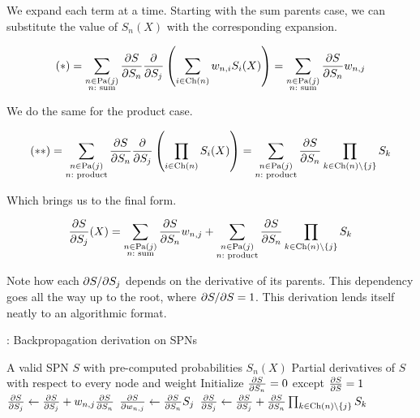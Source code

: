 We expand each term at a time. Starting with the sum parents case, we can substitute the value of
$S_n(X)$ with the corresponding expansion.

\begin{equation*}
  (\ast)=\sum_{\substack{n\in\operatorname*{\text{Pa}}(j)\\n:\text{ sum}}}\frac{\partial S}{\partial S_n}\frac{\partial}{\partial S_j}\left(\sum_{i\in\operatorname*{\text{Ch}}(n)}
    w_{n,i}S_i(X)\right)=\sum_{\substack{n\in\operatorname*{\text{Pa}}(j)\\n:\text{ sum}}}\frac{\partial S}{\partial S_n}w_{n,j}
\end{equation*}

We do the same for the product case.

\begin{equation*}
  (\ast\ast)=\sum_{\substack{n\in\operatorname*{\text{Pa}}(j)\\n:\text{ product}}}\frac{\partial S}{\partial S_n}\frac{\partial}{\partial S_j}\left(\prod_{i\in\operatorname*{\text{Ch}}(n)}
    S_i(X)\right)=\sum_{\substack{n\in\operatorname*{\text{Pa}}(j)\\n:\text{ product}}}\frac{\partial S}{\partial S_n}\prod_{k\in
      \operatorname*{\text{Ch}}(n)\setminus\{j\}}S_k
\end{equation*}

Which brings us to the final form.

\begin{equation}
  \frac{\partial S}{\partial S_j}(X)=\sum_{\substack{n\in\operatorname*{\text{Pa}}(j)\\n:\text{
        sum}}}\frac{\partial S}{\partial S_n}w_{n,j}+\sum_{\substack{n\in\operatorname*{\text{Pa}}(j)\\n: \text{
        product}}}\frac{\partial S}{\partial S_n}\prod_{k\in\operatorname*{\text{Ch}}(n)\setminus\{j\}}S_k
\end{equation}

Note how each $\partial S/\partial S_j$ depends on the derivative of its parents. This dependency goes all
the way up to the root, where $\partial S/\partial S=1$. This derivation lends itself neatly to an
algorithmic format.

\begin{algorithm}[H]
  \caption{: Backpropagation derivation on SPNs}
  \begin{algorithmic}[1]
    \Require A valid SPN $S$ with pre-computed probabilities $S_n(X)$
    \Ensure Partial derivatives of $S$ with respect to every node and weight
    \State Initialize $\frac{\partial S}{\partial S_n}=0$ except $\frac{\partial S}{\partial S}=1$
          \State $\frac{\partial S}{\partial S_j}\gets\frac{\partial S}{\partial S_j}+w_{n,j}\frac{\partial S}{\partial S_n}$
          \State $\frac{\partial S}{\partial w_{n,j}}\gets\frac{\partial S}{\partial S_n}S_j$
        \EndFor%
      \Else%
          \State $\frac{\partial S}{\partial S_j}\gets\frac{\partial S}{\partial S_j}+\frac{\partial S}{\partial S_n}\prod_{k\in\operatorname*{\text{Ch}}(n)\setminus
            \{j\}}S_k$
        \EndFor%
      \EndIf
    \EndFor%
  \end{algorithmic}
\end{algorithm}

